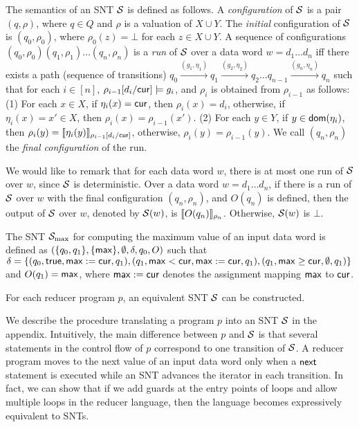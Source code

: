 The semantics of an SNT ${\mathcal{S} }$  is defined as follows. A \emph{configuration} of ${\mathcal{S} }$ is a pair $(q,\rho)$, where $q \in Q$ and $\rho$ is a valuation of $X \cup Y$. The \emph{initial} configuration of ${\mathcal{S} }$ is $(q_0,\rho_0)$, where $\rho_0(z)=\bot$ for each $z \in X\cup Y$.
A sequence of configurations $(q_0,\rho_0)(q_1,\rho_1)\ldots(q_n,\rho_n)$ is
a \emph{run} of ${\mathcal{S} }$ over a data word $w=d_1 \dots d_n$ iff there exists a path (sequence of transitions) $q_0 \xrightarrow{(g_1,\eta_1)} q_1 \xrightarrow{(g_2,\eta_2)} q_2 \dots q_{n-1} \xrightarrow{(g_n, \eta_n)} q_n$ such that for each $i \in [n]$, $\rho_{i-1}[d_i/\mathsf{cur}] \models g_i$, and $\rho_i$ is obtained from $\rho_{i-1}$ as follows: (1) For each $x \in X$, if $\eta_i(x)=\mathsf{cur}$, then $\rho_i(x)=d_i$, otherwise, if $\eta_i(x)=x' \in X$, then $\rho_i(x)=\rho_{i-1}(x')$. (2) For each $y \in Y$, if $y \in \mathsf{dom}(\eta_i)$, then $\rho_i(y)=\llbracket\eta_i(y)\rrbracket_{\rho_{i-1}[d_i/\mathsf{cur}]}$, otherwise, $\rho_i(y)=\rho_{i-1}(y)$.
We call $(q_n,\rho_n)$ the \emph{final configuration} of the run. %

We would like to remark that for each data word $w$, there is at most one run of ${\mathcal{S} }$ over $w$, since ${\mathcal{S} }$ is deterministic. 
Over a data word $w = d_1 \dots d_n$, if there is a run of ${\mathcal{S} }$ over $w$ with the final configuration $(q_n,\rho_n)$, and $O(q_n)$ is defined, then the output of ${\mathcal{S} }$ over $w$, denoted by ${{\mathcal{S} }}(w)$, is $\llbracket O(q_n)\rrbracket_{\rho_n}$. Otherwise, ${{\mathcal{S} }}(w)$ is $\bot$.

\begin{example}
The SNT ${\mathcal{S} }_{\max}$ for computing the maximum value of an input data word is defined as $(\{q_0,q_1\}, \{\mathsf{max}\}, \emptyset, \delta, q_0, O)$ such that $\delta = \{(q_0, \mathsf{true}, \mathsf{max}:=\mathsf{cur}, q_1), (q_1, \mathsf{max} < \mathsf{cur}, \mathsf{max}:=\mathsf{cur},q_1), (q_1, \mathsf{max} \ge \mathsf{cur}, \emptyset, q_1)\}$ and $O(q_1)=\mathsf{max}$, where $\mathsf{max}:=\mathsf{cur}$ denotes the assignment mapping $\mathsf{max}$ to $\mathsf{cur}$.
\end{example}
\begin{proposition}\label{prop-mrprog-to-snt}
For each reducer program $p$, an equivalent SNT ${\mathcal{S} }$ can be constructed.
\end{proposition}
We describe the procedure translating a program $p$ into an SNT ${\mathcal{S} }$ in the appendix. Intuitively, the main difference between $p$ and ${\mathcal{S} }$ is that several statements in the control flow of $p$ correspond to one transition of ${\mathcal{S} }$. A reducer program moves to the next value of an input data word only when a $\mathsf{next}$ statement is executed while an SNT advances the iterator in each transition. 
In fact, we can show that if we add guards at the entry points of loops and allow multiple loops in the reducer language, then the language becomes expressively equivalent to SNTs.

